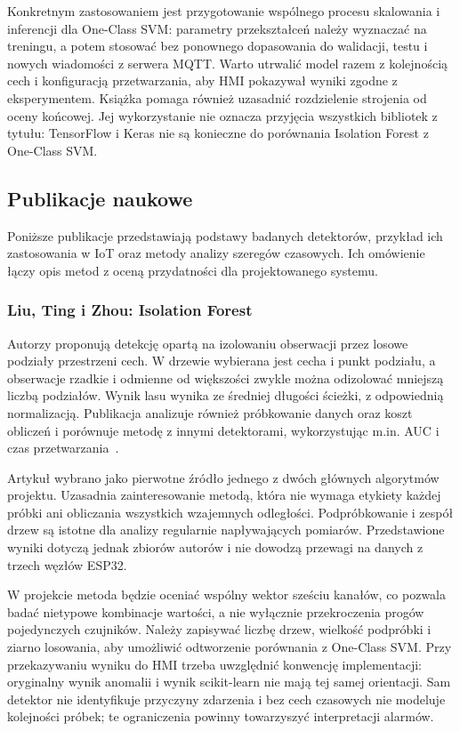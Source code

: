 \documentclass[12pt,a4paper]{article}
\begin{document}
Konkretnym zastosowaniem jest przygotowanie wspólnego procesu skalowania
i inferencji dla One-Class SVM: parametry przekształceń należy wyznaczać
na treningu, a potem stosować bez ponownego dopasowania do walidacji, testu
i nowych wiadomości z serwera MQTT. Warto utrwalić model razem z kolejnością
cech i konfiguracją przetwarzania, aby HMI pokazywał wyniki zgodne
z eksperymentem. Książka pomaga również uzasadnić rozdzielenie strojenia
od oceny końcowej. Jej wykorzystanie nie oznacza przyjęcia wszystkich
bibliotek z tytułu: TensorFlow i Keras nie są konieczne do porównania
Isolation Forest z One-Class SVM.

\subsection{Publikacje naukowe}

Poniższe publikacje przedstawiają podstawy badanych detektorów, przykład
ich zastosowania w IoT oraz metody analizy szeregów czasowych. Ich omówienie
łączy opis metod z oceną przydatności dla projektowanego systemu.

\subsubsection{Liu, Ting i Zhou: Isolation Forest}
Autorzy proponują detekcję opartą na izolowaniu obserwacji przez losowe
podziały przestrzeni cech. W drzewie wybierana jest cecha i punkt podziału,
a obserwacje rzadkie i odmienne od większości zwykle można odizolować
mniejszą liczbą podziałów. Wynik lasu wynika ze średniej długości ścieżki,
z odpowiednią normalizacją. Publikacja analizuje również próbkowanie danych
oraz koszt obliczeń i porównuje metodę z innymi detektorami, wykorzystując
m.in. AUC i czas przetwarzania~\cite{liu2008}.

Artykuł wybrano jako pierwotne źródło jednego z dwóch głównych algorytmów
projektu. Uzasadnia zainteresowanie metodą, która nie wymaga etykiety każdej
próbki ani obliczania wszystkich wzajemnych odległości. Podpróbkowanie
i zespół drzew są istotne dla analizy regularnie napływających pomiarów.
Przedstawione wyniki dotyczą jednak zbiorów autorów i nie dowodzą przewagi
na danych z trzech węzłów ESP32.

W projekcie metoda będzie oceniać wspólny wektor sześciu kanałów, co pozwala
badać nietypowe kombinacje wartości, a nie wyłącznie przekroczenia progów
pojedynczych czujników. Należy zapisywać liczbę drzew, wielkość podpróbki
i ziarno losowania, aby umożliwić odtworzenie porównania z One-Class SVM.
Przy przekazywaniu wyniku do HMI trzeba uwzględnić konwencję implementacji:
oryginalny wynik anomalii i wynik scikit-learn nie mają tej samej orientacji.
Sam detektor nie identyfikuje przyczyny zdarzenia i bez cech czasowych nie
modeluje kolejności próbek; te ograniczenia powinny towarzyszyć interpretacji
alarmów.
\end{document}
